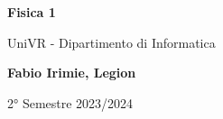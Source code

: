 \begin{titlepage}
	\begin{center}
		\vspace*{1cm}

		\Huge
		\textbf{Fisica 1}

		\vspace{0.5cm}
		\LARGE
		UniVR - Dipartimento di Informatica

		\vspace{1.5cm}

		\textbf{Fabio Irimie, Legion}

		\vfill


		\vspace{0.8cm}


		2° Semestre 2023/2024

	\end{center}
\end{titlepage}
